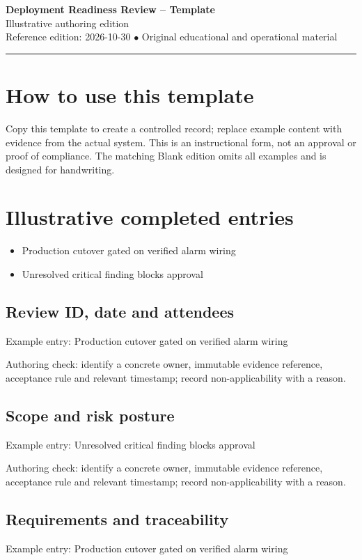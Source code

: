 \documentclass[10pt,letterpaper]{article}
\begin{document}
\begin{center}
{\LARGE\bfseries\color{cdblue}Deployment Readiness Review -- Template}\\[7pt]
{\large Illustrative authoring edition}\\[6pt]
{\small Reference edition: 2026-10-30 $\bullet$ Original educational and operational material}
\end{center}
\noindent\color{cdblue}\rule{\linewidth}{1.2pt}\color{black}
\vspace{0.4em}
\section{How to use this template}
Copy this template to create a controlled record; replace example content with evidence from the actual system. This is an instructional form, not an approval or proof of compliance. The matching Blank edition omits all examples and is designed for handwriting.


\section{Illustrative completed entries}
\begin{itemize}
\item Production cutover gated on verified alarm wiring
\item Unresolved critical finding blocks approval
\end{itemize}

\subsection{Review ID, date and attendees}
Example entry: Production cutover gated on verified alarm wiring

Authoring check: identify a concrete owner, immutable evidence reference, acceptance rule and relevant timestamp; record non-applicability with a reason.


\subsection{Scope and risk posture}
Example entry: Unresolved critical finding blocks approval

Authoring check: identify a concrete owner, immutable evidence reference, acceptance rule and relevant timestamp; record non-applicability with a reason.


\subsection{Requirements and traceability}
Example entry: Production cutover gated on verified alarm wiring
\end{document}
